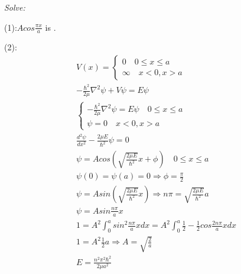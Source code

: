 \documentclass{article}
\begin{document}
  \textit{Solve:}
  
  (1):$Acos\frac{\pi x}a$ is .

  (2):\begin{align*}
  & V(x)=\begin{cases}
      0\quad 0\le x\le a\\
      \infty \quad x<0,x>a
  \end{cases}\\
  &-\frac{\hbar^2}{2\mu}\nabla^2 \psi+V\psi=E\psi \\
  &\begin{cases} 
  -\frac{\hbar^2}{2\mu}\nabla^2\psi=E\psi\quad 0\le x\le a\\
  \psi=0 \quad x<0,x>a
  \end{cases}\\
  &\frac{d^2\psi}{dx^2}-\frac{2\mu E}{\hbar^2}\psi=0 \\
  &\psi=Acos(\sqrt{\frac{2\mu E}{\hbar^2}}x+\phi)\quad 0\le x \le a \\
  &\psi(0)=\psi(a)=0\Rightarrow \phi=\frac{\pi}2 \\
  &\psi=Asin(\sqrt{\frac{2\mu E}{\hbar^2}}x)\Rightarrow n\pi=\sqrt{\frac{2\mu E}{\hbar^2}}a \\
  &\psi=Asin\frac{n\pi}ax \\
  &1=A^2\int ^{a}_{0} sin^2\frac{n\pi}ax dx=A^2\int ^a_0 \frac12-\frac12cos\frac{2n\pi}ax dx \\
  &1=A^2 \frac12 a \Rightarrow A=\sqrt{\frac2a} \\
  &E=\frac{n^2\pi^2\hbar^2 }{2\mu a^2} \\
  \end{align*}
\end{document}
